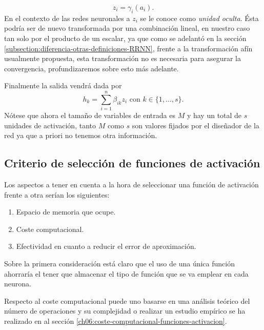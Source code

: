 \begin{equation}
    z_i = \gamma_i(a_i).
\end{equation}
En el contexto de las redes neuronales a $z_i$ se le conoce como \textit{unidad oculta}. Ésta  podría ser de 
nuevo  transformada por una combinación lineal, en nuestro caso tan solo 
por el producto de un escalar, ya que como se adelantó en la sección \ref{subsection:diferencia-otras-definiciones-RRNN},
 frente a la transformación afín usualmente propuesta, esta transformación no es necesaria para asegurar la convergencia, profundizaremos sobre esto más adelante. 

 Finalmente la salida vendrá dada por
 \begin{equation}
    h_k = \sum_{i=1}^n \beta_{i k} z_i 
    \text{ con } k \in \{1, \ldots, s \}.
\end{equation}
Nótese que ahora el tamaño de variables de entrada es $M$
y hay un total de $s$ unidades de activación, tanto $M$ como $s$ son
valores fijados por el diseñador de la red ya que a priori no tenemos otra información. 


\subsection{Criterio de selección de funciones de activación}

Los aspectos a tener en cuenta a la hora de seleccionar una función 
de activación frente a otra serían los siguientes:
\begin{enumerate}
    \item Espacio de memoria que ocupe.
    \item Coste computacional.
    \item Efectividad en cuanto a reducir el error de aproximación.
\end{enumerate}

Sobre la primera consideración está claro que el uso de una única función ahorraría el tener que almacenar el tipo de función que se va emplear en cada neurona.

Respecto al coste computacional puede uno basarse en una análisis teórico del número de 
operaciones y su complejidad o realizar un estudio empírico se ha realizado 
en al sección \ref{ch06:coste-computacional-funciones-activacion}.

